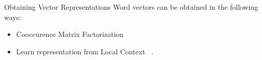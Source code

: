 
\begin{frame}{Obtaining Vector Representations}
  Word vectors can be obtained in the following ways:
  \begin{itemize}[<+->]
  \item Cooccurence Matrix Factorization ~\cite{Deerwester}
  \item Learn representation from Local Context ~\cite{Mikolov13a}.
  \end{itemize}
\end{frame}

